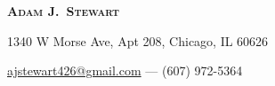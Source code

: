 
\begin{center}

    \textbf{\textsc{\Large Adam J.\ Stewart}}

    1340 W Morse Ave, Apt 208, Chicago, IL 60626

    \href{mailto:ajstewart426@gmail.com}{ajstewart426@gmail.com} --- (607) 972-5364

\end{center}

\vspace{-14pt}
